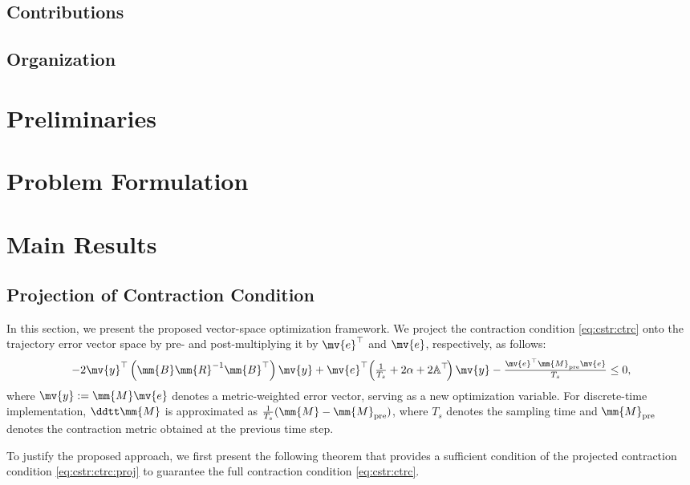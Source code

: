 \documentclass[lettersize,journal]{IEEEtran}
\begin{document}
\subsection{Contributions}

\subsection{Organization}

\section{Preliminaries}

\section{Problem Formulation}

\section{Main Results}

\subsection{Projection of Contraction Condition}

In this section, we present the proposed vector-space optimization framework.
We project the contraction condition \eqref{eq:cstr:ctrc} onto the trajectory error vector space by pre- and post-multiplying it by $\mv{e}^\top$ and $\mv{e}$, respectively, as follows:
\begin{equation} \label{eq:cstr:ctrc:proj}
   -
   2
   \mv{y}^\top 
   \left(
      \mm{B} 
      \mm{R}^{-1} 
      \mm{B}^\top
   \right)
   \mv{y}
   +
   \mv{e}^\top
   \!
   \left(
      \tfrac{1}{T_s}+2\alpha
      +
      2\mathbb{A}^\top
   \!
   \right)
   \mv{y}
   -
   \tfrac{\mv{e}^\top \mm{M}_{\rm{pre}} \mv{e}}{T_s}
   \le 0
   ,
\end{equation}
where $\mv{y}:=\mm{M}\mv{e}$ denotes a metric-weighted error vector, serving as a new optimization variable.
For discrete-time implementation, $\ddtt\mm{M}$ is approximated as $\tfrac{1}{T_s}(\mm{M}-\mm{M}_{\rm{pre}})$, where $T_s$ denotes the sampling time and $\mm{M}_{\rm{pre}}$ denotes the contraction metric obtained at the previous time step.

To justify the proposed approach, we first present the following theorem that provides a sufficient condition of the projected contraction condition \eqref{eq:cstr:ctrc:proj} to guarantee the full contraction condition \eqref{eq:cstr:ctrc}.
\end{document}
